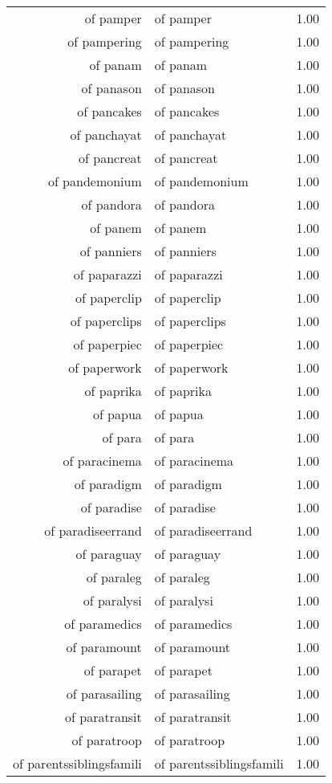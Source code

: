 \begin{table}[ht]
\begin{tabular}{rlr}
  of pamper & of pamper & 1.00 \\ 
  of pampering & of pampering & 1.00 \\ 
  of panam & of panam & 1.00 \\ 
  of panason & of panason & 1.00 \\ 
  of pancakes & of pancakes & 1.00 \\ 
  of panchayat & of panchayat & 1.00 \\ 
  of pancreat & of pancreat & 1.00 \\ 
  of pandemonium & of pandemonium & 1.00 \\ 
  of pandora & of pandora & 1.00 \\ 
  of panem & of panem & 1.00 \\ 
  of panniers & of panniers & 1.00 \\ 
  of paparazzi & of paparazzi & 1.00 \\ 
  of paperclip & of paperclip & 1.00 \\ 
  of paperclips & of paperclips & 1.00 \\ 
  of paperpiec & of paperpiec & 1.00 \\ 
  of paperwork & of paperwork & 1.00 \\ 
  of paprika & of paprika & 1.00 \\ 
  of papua & of papua & 1.00 \\ 
  of para & of para & 1.00 \\ 
  of paracinema & of paracinema & 1.00 \\ 
  of paradigm & of paradigm & 1.00 \\ 
  of paradise & of paradise & 1.00 \\ 
  of paradiseerrand & of paradiseerrand & 1.00 \\ 
  of paraguay & of paraguay & 1.00 \\ 
  of paraleg & of paraleg & 1.00 \\ 
  of paralysi & of paralysi & 1.00 \\ 
  of paramedics & of paramedics & 1.00 \\ 
  of paramount & of paramount & 1.00 \\ 
  of parapet & of parapet & 1.00 \\ 
  of parasailing & of parasailing & 1.00 \\ 
  of paratransit & of paratransit & 1.00 \\ 
  of paratroop & of paratroop & 1.00 \\ 
  of parentssiblingsfamili & of parentssiblingsfamili & 1.00 \\ 

\end{tabular}
\end{table}
